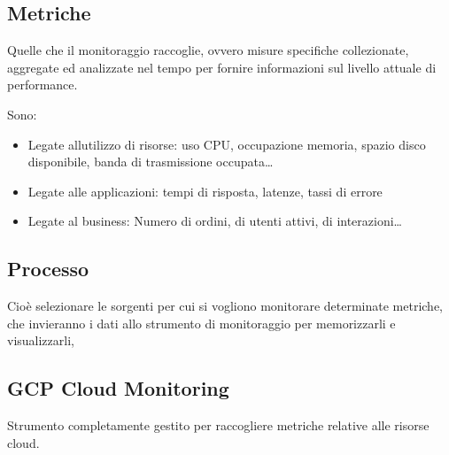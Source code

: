 \documentclass[
]{article}
\providecommand{\tightlist}{%
  \setlength{\itemsep}{0pt}\setlength{\parskip}{0pt}}
\begin{document}
{}

\subsection{\texorpdfstring{{Metriche}}{Metriche}}\label{h.xlwrycdfouhq}

{Quelle che il monitoraggio raccoglie, ovvero misure specifiche
collezionate, aggregate ed analizzate nel tempo per fornire informazioni
sul livello attuale di performance.}

{}

{Sono:}

\begin{itemize}
\tightlist
\item
  {Legate all\textquotesingle utilizzo di risorse}{: uso CPU,
  occupazione memoria, spazio disco disponibile, banda di trasmissione
  occupata\ldots{} }
\end{itemize}

{}

\begin{itemize}
\tightlist
\item
  {Legate alle applicazioni}{: tempi di risposta, latenze, tassi di
  errore }
\end{itemize}

{}

\begin{itemize}
\tightlist
\item
  {Legate al business}{: Numero di ordini, di utenti attivi, di
  interazioni\ldots{}}
\end{itemize}

{}

\subsection{\texorpdfstring{{Processo}}{Processo}}\label{h.u3awi55qdlgz}

{Cioè selezionare le sorgenti per cui si vogliono monitorare determinate
metriche, che invieranno i dati allo strumento di monitoraggio per
memorizzarli e visualizzarli,}

{}

\subsection{\texorpdfstring{{GCP Cloud
Monitoring}}{GCP Cloud Monitoring}}\label{h.3beopg8zc8u5}

{Strumento completamente gestito per raccogliere metriche relative alle
risorse cloud.}
\end{document}
